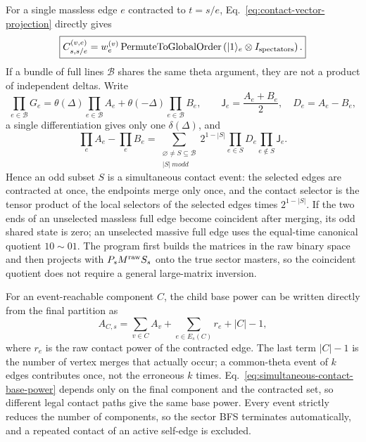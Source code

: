 \documentclass[11pt,a4paper]{article}
\begin{document}
For a single massless edge $e$ contracted to $t=s/e$, Eq.~\eqref{eq:contact-vector-projection} directly gives
\begin{equation}
 \boxed{
 C_{s,s/e}^{(v,e)}
 =w_e^{(v)}
 \operatorname{PermuteToGlobalOrder}
 \left(|1\rangle_e\otimes I_{\rm spectators}\right).
 }
 \label{eq:contact-injection}
\end{equation}
If a bundle of full lines $\mathcal B$ shares the same theta argument, they are not a product of independent deltas. Write
\begin{equation}
 \prod_{e\in\mathcal B}G_e
 =\theta(\Delta)\prod_{e\in\mathcal B}A_e
 +\theta(-\Delta)\prod_{e\in\mathcal B}B_e,
 \qquad
 \mathsf J_e=\frac{A_e+B_e}{2},\quad D_e=A_e-B_e,
\end{equation}
a single differentiation gives only one $\delta(\Delta)$, and
\begin{equation}
 \prod_eA_e-\prod_eB_e
 =\sum_{\substack{\varnothing\neq S\subseteq\mathcal B\\|S|\ {m odd}}}
 2^{1-|S|}\prod_{e\in S}D_e\prod_{e\notin S}\mathsf J_e.
 \label{eq:common-theta-odd-subsets}
\end{equation}
Hence an odd subset $S$ is a simultaneous contact event: the selected edges are contracted at once, the endpoints merge only once, and the contact selector is the tensor product of the local selectors of the selected edges times $2^{1-|S|}$. If the two ends of an unselected massless full edge become coincident after merging, its odd shared state is zero; an unselected massive full edge uses the equal-time canonical quotient $10\sim01$. The program first builds the matrices in the raw binary space and then projects with $P_sM^{\rm raw}S_s$ onto the true sector masters, so the coincident quotient does not require a general large-matrix inversion.

For an event-reachable component $C$, the child base power can be written directly from the final partition as
\begin{equation}
 A_{C,s}=\sum_{v\in C}A_v
 +\sum_{e\in E_s(C)}r_e+|C|-1,
 \label{eq:simultaneous-contact-base-power}
\end{equation}
where $r_e$ is the raw contact power of the contracted edge. The last term $|C|-1$ is the number of vertex merges that actually occur; a common-theta event of $k$ edges contributes once, not the erroneous $k$ times. Eq.~\eqref{eq:simultaneous-contact-base-power} depends only on the final component and the contracted set, so different legal contact paths give the same base power.
Every event strictly reduces the number of components, so the sector BFS terminates automatically, and a repeated contact of an active self-edge is excluded.
\end{document}
